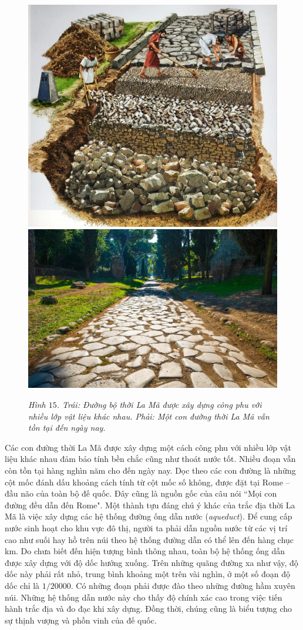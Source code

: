 \begin{multicols}{2}
	\begin{figure}[H]
		\vspace*{-5pt}
		\centering
		\captionsetup{labelformat= empty, justification=centering}
		\includegraphics[height= 0.36\linewidth]{15a}
		\includegraphics[height= 0.36\linewidth]{15b}
		\caption{\small\textit{\color{toanhocdoisong}Hình $15$. Trái: Đường bộ thời La Mã được xây dựng công phu với nhiều lớp vật liệu khác nhau. Phải: Một con đường thời La Mã vẫn tồn tại đến ngày nay.}}
		\vspace*{-10pt}
	\end{figure}
	Các con đường thời La Mã được xây dựng một cách công phu với nhiều lớp vật liệu khác nhau đảm bảo tính bền chắc cũng như thoát nước tốt. Nhiều đoạn vẫn còn tồn tại hàng nghìn năm cho đến ngày nay. Dọc theo các con đường là những cột mốc đánh dấu khoảng cách tính từ cột mốc số không, được đặt tại Rome -- đầu não của toàn bộ đế quốc. Đây cũng là nguồn gốc của câu nói ``Mọi con đường đều dẫn đến Rome".
	\vskip 0.1cm
	Một thành tựu đáng chú ý khác của trắc địa thời La Mã là việc xây dựng các hệ thống đường ống dẫn nước (\textit{aqueduct}). Để cung cấp nước sinh hoạt cho khu vực đô thị, người ta phải dẫn nguồn nước từ các vị trí cao như suối hay hồ trên núi theo hệ thống đường dẫn có thể lên đến hàng chục km. Do chưa biết đến hiện tượng bình thông nhau, toàn bộ hệ thống ống dẫn được xây dựng với độ dốc hướng xuống. Trên những quãng đường xa như vậy, độ dốc này phải rất nhỏ, trung bình khoảng một trên vài nghìn, ở một số đoạn độ dốc chỉ là $1/20000$. Có những đoạn phải được đào theo những đường hầm xuyên núi. Những hệ thống dẫn nước này cho thấy độ chính xác cao trong việc tiến hành trắc địa và đo đạc khi xây dựng. Đồng thời, chúng cũng là biểu tượng cho sự thịnh vượng và phồn vinh của đế quốc.

\end{multicols}
